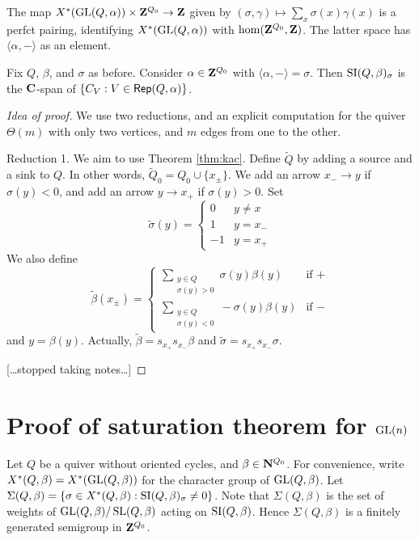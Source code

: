 \documentclass{article}
\begin{document}
The map $X^\ast(\operatorname{GL}(Q,\alpha))\times \mathbf{Z}^{Q_0} \to \mathbf{Z}$ given by 
$(\sigma,\gamma)\mapsto \sum_x \sigma(x) \gamma(x)$ is a perfct pairing, 
identifying $X^\ast(\operatorname{GL}(Q,\alpha))$ with $\hom(\mathbf{Z}^{Q_0},\mathbf{Z})$. The 
latter space has $\langle \alpha,-\rangle$ as an element. 

\begin{theorem}
Fix $Q$, $\beta$, and $\sigma$ as before. Consider $\alpha\in \mathbf{Z}^{Q_0}$ with 
$\langle \alpha,-\rangle = \sigma$. Then $\operatorname{SI}(Q,\beta)_\sigma$ is 
the $\mathbf{C}$-span of $\{C_V:V\in \operatorname{\mathsf{Rep}}(Q,\alpha)\}$. 
\end{theorem}
\begin{proof}[Idea of proof]
We use two reductions, and an explicit computation for the quiver $\Theta(m)$ with 
only two vertices, and $m$ edges from one to the other. 

Reduction 1. We aim to use Theorem \ref{thm:kac}. Define $\widetilde Q$ by adding 
a source and a sink to $Q$. In other words, $\widetilde Q_0 = Q_0\cup \{x_\pm\}$. 
We add an arrow $x_- \to y$ if $\sigma(y)<0$, and add an arrow 
$y\to x_+$ if $\sigma(y)>0$. Set 
\[
  \widetilde\sigma(y) = 
  \begin{cases}
    0 & y\ne x \\
    1 & y=x_- \\
    -1 & y=x_+ 
  \end{cases}
\]
We also define 
\[
  \widetilde\beta(x_\pm) = 
  \begin{cases}
    \sum_{\substack{y\in Q \\ \sigma(y)>0}} \sigma(y) \beta(y) & \text{if }+ \\
    \sum_{\substack{y\in Q \\ \sigma(y)<0}} -\sigma(y) \beta(y) & \text{if }- 
  \end{cases}
\]
and $y=\beta(y)$. Actually, 
$\widetilde\beta=s_{x_+}s_{x_-} \beta$ and 
$\widetilde\sigma=s_{x_+}s_{x_-} \sigma$. 

[\ldots stopped taking notes\ldots]
\end{proof}





\section{Proof of saturation theorem for \texorpdfstring{$\operatorname{GL}(n)$}{GL(n)}}

Let $Q$ be a quiver without oriented cycles, and $\beta\in \mathbf{N}^{Q_0}$. For 
convenience, write $X^\ast(Q,\beta)=X^\ast(\operatorname{GL}(Q,\beta))$ for the 
character group of $\operatorname{GL}(Q,\beta)$. Let
$\Sigma(Q,\beta)=\{\sigma \in X^\ast(Q,\beta):\operatorname{SI}(Q,\beta)_\sigma\ne 0\}$. 
Note that $\Sigma(Q,\beta)$ is the set of weights of 
$\operatorname{GL}(Q,\beta)/\operatorname{SL}(Q,\beta)$ acting on 
$\operatorname{SI}(Q,\beta)$. Hence $\Sigma(Q,\beta)$ is a finitely generated 
semigroup in $\mathbf{Z}^{Q_0}$. 
\end{document}
